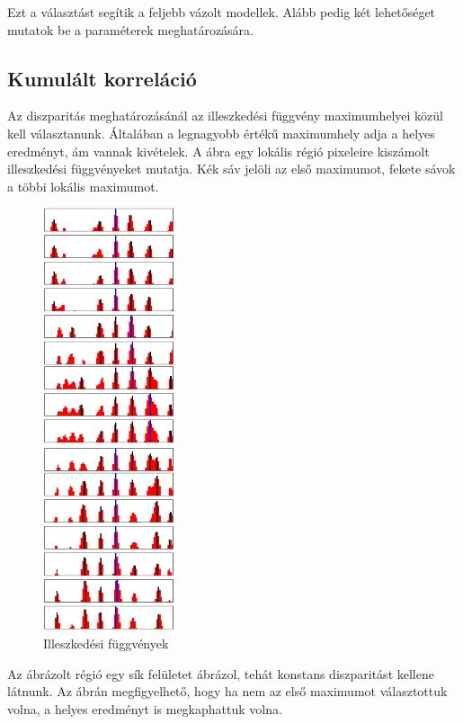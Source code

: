 Ezt a választást segítik a feljebb vázolt modellek.
Alább pedig két lehetőséget mutatok be a paraméterek meghatározására.

\subsection{Kumulált korreláció}\label{sect:CumCorr}

Az diszparitás meghatározásánál az illeszkedési függvény maximumhelyei közül kell választanunk.
Általában a legnagyobb értékű maximumhely adja a helyes eredményt, ám vannak kivételek.
A  ábra egy lokális régió pixeleire kiszámolt illeszkedési függvényeket mutatja.
Kék sáv jelöli az első maximumot, fekete sávok a többi lokális maximumot. 
\begin{figure}
	\centering
	\includegraphics[width=0.35\textwidth]{figures/matchresult.png}
	\caption{Illeszkedési függvények}
	\label{fig:matchResult}
\end{figure}
Az ábrázolt régió egy sík felületet ábrázol, tehát konstans diszparitást kellene látnunk.
Az ábrán megfigyelhető, hogy ha nem az első maximumot választottuk volna, a helyes eredményt is megkaphattuk volna.

